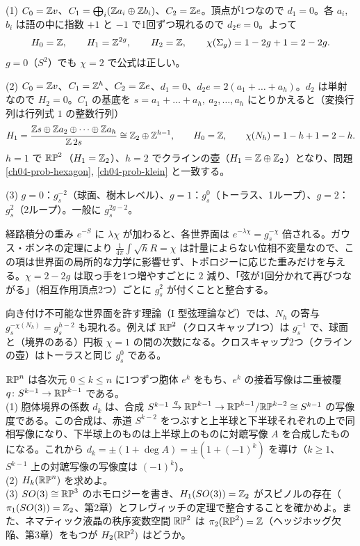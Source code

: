 \begin{solution}
(1) $C_0=\mathbb{Z} v$、$C_1=\bigoplus_i(\mathbb{Z} a_i\oplus\mathbb{Z} b_i)$、$C_2=\mathbb{Z} e$。頂点が1つなので $d_1=0$。各 $a_i$, $b_i$ は語の中に指数 $+1$ と $-1$ で1回ずつ現れるので $d_2e=0$。よって
\[
H_0=\mathbb{Z},\qquad H_1=\mathbb{Z}^{2g},\qquad H_2=\mathbb{Z},\qquad\chi(\Sigma_g)=1-2g+1=2-2g .
\]
$g=0$（$S^2$）でも $\chi=2$ で公式は正しい。

(2) $C_0=\mathbb{Z} v$、$C_1=\mathbb{Z}^h$、$C_2=\mathbb{Z} e$、$d_1=0$、$d_2e=2(a_1+\dots+a_h)$。$d_2$ は単射なので $H_2=0$。$C_1$ の基底を $s=a_1+\dots+a_h,\ a_2,\dots,a_h$ にとりかえると（変換行列は行列式 $1$ の整数行列）
\[
H_1=\frac{\mathbb{Z} s\oplus\mathbb{Z} a_2\oplus\dots\oplus\mathbb{Z} a_h}{\mathbb{Z}\,2s}\cong\mathbb{Z}_2\oplus\mathbb{Z}^{h-1},\qquad H_0=\mathbb{Z},\qquad\chi(N_h)=1-h+1=2-h .
\]
$h=1$ で $\mathbb{RP}^2$（$H_1=\mathbb{Z}_2$）、$h=2$ でクラインの壺（$H_1=\mathbb{Z}\oplus\mathbb{Z}_2$）となり、問題 \ref{ch04-prob-hexagon}, \ref{ch04-prob-klein} と一致する。

(3) $g=0$：$g_s^{-2}$（球面、樹木レベル）、$g=1$：$g_s^{0}$（トーラス、1ループ）、$g=2$：$g_s^{2}$（2ループ）。一般に $g_s^{2g-2}$。

経路積分の重み $e^{-S}$ に $\lambda\chi$ が加わると、各世界面は $e^{-\lambda\chi}=g_s^{-\chi}$ 倍される。ガウス・ボンネの定理により $\frac1{4\pi}\int\sqrt hR=\chi$ は計量によらない位相不変量なので、この項は世界面の局所的な力学に影響せず、トポロジーに応じた重みだけを与える。$\chi=2-2g$ は取っ手を1つ増やすごとに $2$ 減り、「弦が1回分かれて再びつながる」（相互作用頂点2つ）ごとに $g_s^2$ が付くことと整合する。

向き付け不可能な世界面を許す理論（I 型弦理論など）では、$N_h$ の寄与 $g_s^{-\chi(N_h)}=g_s^{h-2}$ も現れる。例えば $\mathbb{RP}^2$（クロスキャップ1つ）は $g_s^{-1}$ で、球面と（境界のある）円板 $\chi=1$ の間の次数になる。クロスキャップ2つ（クラインの壺）はトーラスと同じ $g_s^0$ である。
\end{solution}

\begin{problem}[難易度 C]\label{ch04-prob-rpn}
$\mathbb{RP}^n$ は各次元 $0\le k\le n$ に1つずつ胞体 $e^k$ をもち、$e^k$ の接着写像は二重被覆 $q\colon S^{k-1}\to\mathbb{RP}^{k-1}$ である。\\
(1) 胞体境界の係数 $d_k$ は、合成 $S^{k-1}\xrightarrow{q}\mathbb{RP}^{k-1}\to\mathbb{RP}^{k-1}/\mathbb{RP}^{k-2}\cong S^{k-1}$ の写像度である。この合成は、赤道 $S^{k-2}$ をつぶすと上半球と下半球それぞれの上で同相写像になり、下半球上のものは上半球上のものに対蹠写像 $A$ を合成したものになる。これから $d_k=\pm(1+\deg A)=\pm(1+(-1)^k)$ を導け（$k\ge1$、$S^{k-1}$ 上の対蹠写像の写像度は $(-1)^k$）。\\
(2) $H_k(\mathbb{RP}^n)$ を求めよ。\\
(3) $SO(3)\cong\mathbb{RP}^3$ のホモロジーを書き、$H_1(SO(3))=\mathbb{Z}_2$ がスピノルの存在（$\pi_1(SO(3))=\mathbb{Z}_2$、第2章）とフレヴィッチの定理で整合することを確かめよ。また、ネマティック液晶の秩序変数空間 $\mathbb{RP}^2$ は $\pi_2(\mathbb{RP}^2)=\mathbb{Z}$（ヘッジホッグ欠陥、第3章）をもつが $H_2(\mathbb{RP}^2)$ はどうか。
\end{problem}

